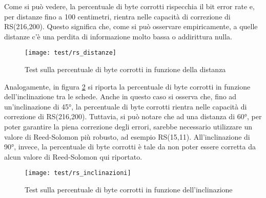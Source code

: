 Come si può vedere, la percentuale di byte corrotti rispecchia il bit error rate e, per distanze fino a 100 centimetri, rientra nelle capacità di correzione di RS(216,200). Questo significa che, come si può osservare empiricamente, a quelle distanze c'è una perdita di informazione molto bassa o addirittura nulla.

\begin{figure}[H] 
    \centering 
    \texttt{[image: test/rs\_distanze]} 
    \caption{Test sulla percentuale di byte corrotti in funzione della distanza}
    \label{fig:rs_distanze}
\end{figure}

Analogamente, in figura \ref{fig:rs_inclinazioni} si riporta la percentuale di byte corrotti in funzione dell'inclinazione tra le schede. Anche in questo caso si osserva che, fino ad un'inclinazione di 45°, la percentuale di byte corrotti rientra nelle capacità di correzione di RS(216,200). Tuttavia, si può notare che ad una distanza di 60°, per poter garantire la piena correzione degli errori, sarebbe necessario utilizzare un valore di Reed-Solomon più robusto, ad esempio RS(15,11). All'inclinazione di 90°, invece, la percentuale di byte corrotti è tale da non poter essere corretta da alcun valore di Reed-Solomon qui riportato.

\begin{figure}[H] 
    \centering 
    \texttt{[image: test/rs\_inclinazioni]} 
    \caption{Test sulla percentuale di byte corrotti in funzione dell'inclinazione}
    \label{fig:rs_inclinazioni}
\end{figure}